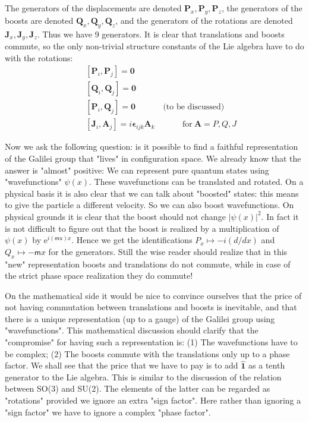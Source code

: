 \documentclass[onecolumn,fleqn]{revtex4}
\newcommand{\eexp}{\mathrm{e}^}
\newcommand{\mass}{\mathsf{m}}
\newcommand{\beq}{\begin{eqnarray}}
\newcommand{\eeq}{\end{eqnarray}}
\begin{document}
The generators of the displacements 
are denoted $\mathbf{P}_{x}, \mathbf{P}_{y}, \mathbf{P}_{z}$, 
the generators of the boosts are 
denoted $\mathbf{Q}_{x}, \mathbf{Q}_{y}, \mathbf{Q}_{z}$, 
and the generators of the rotations are 
denoted $\mathbf{J}_{x}, \mathbf{J}_{y}, \mathbf{J}_{z}$. 
Thus we have 9 generators. It is clear 
that translations and boosts commute, so the only non-trivial 
structure constants of the Lie algebra have to do 
with the rotations:
\beq
&& \left[ \mathbf{P}_{i}, \mathbf{P}_{j}\right] = \mathbf{0} \\ 
&& \left[ \mathbf{Q}_{i}, \mathbf{Q}_{j}\right] = \mathbf{0} \\ 
&& \left[ \mathbf{P}_{i}, \mathbf{Q}_{j}\right] = \mathbf{0} 
\ \ \ \ \ \ \ \ \ \ \ \ \ \ \ \mbox{(to be discussed)} \\ 
&& \left[ \mathbf{J}_{i}, \mathbf{A}_{j}\right] = i \mathbf{\epsilon}_{ijk} \mathbf{A}_{k} 
\ \ \ \ \ \ \ \ \ \ \ \ \ \ \ \mbox{for} \ \mathbf{A}=P,Q,J 
\eeq


Now we ask the following question: is it 
possible to find a faithful representation  
of the Galilei group that "lives" 
in configuration space. We already know 
that the answer is "almost" positive: 
We can represent pure quantum states 
using "wavefunctions" $\psi(x)$.  
These wavefunctions can be translated and rotated.  
On a physical basis it is also clear that 
we can talk about "boosted" states: 
this means to give the particle a different velocity. 
So we can also boost wavefunctions. 
On physical grounds it is clear that 
the boost should not change $|\psi(x)|^2$. 
In fact it is not difficult to figure out 
that the boost is realized 
by a multiplication of $\psi(x)$ 
by $\eexp{i(\mass u)x}$.  Hence we get the 
identifications $P_x \mapsto -i(d/dx)$ 
and $Q_x \mapsto -\mass x$ for the generators.    
Still the wise reader should realize that 
in this "new" representation boosts and translations 
do not commute, while in case of the strict 
phase space realization they do commute!


On the mathematical side it would be nice 
to convince ourselves that the price of not having 
commutation between translations and boosts 
is inevitable, and that there is a unique 
representation (up to a gauge)  
of the Galilei group using "wavefunctions". 
This mathematical discussion should clarify 
that the "compromise" for having such a representation 
is: (1) The wavefunctions have to be complex; 
(2) The boosts commute with the translations 
only up to a phase factor. We shall see that 
the price that we have to pay is 
to add $\hat{\mathbf{1}}$ as a tenth generator 
to the Lie algebra. This is similar to 
the discussion of the relation 
between SO(3) and SU(2). The elements of 
the latter can be regarded as "rotations" provided  
we ignore an extra "sign factor". 
Here rather than ignoring a "sign factor" 
we have to ignore a complex "phase factor".   
\end{document}
